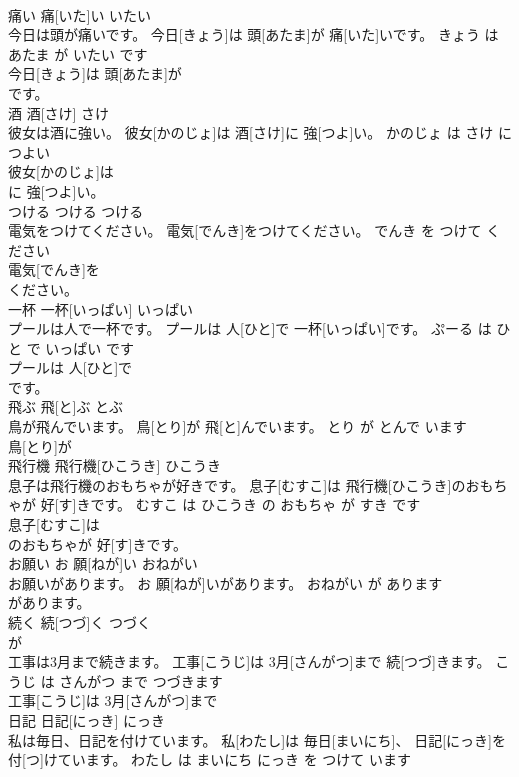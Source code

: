 \documentclass[8pt]{extreport}
\begin{document}
\begin{CJK}{UTF8}{min}
\\	痛い	痛[いた]い	いたい	
\\	今日は頭が痛いです。	今日[きょう]は 頭[あたま]が 痛[いた]いです。	きょう は あたま が いたい です	
\\	今日[きょう]は 頭[あたま]が
\\	です。		
\\	酒	酒[さけ]	さけ	
\\	彼女は酒に強い。	彼女[かのじょ]は 酒[さけ]に 強[つよ]い。	かのじょ は さけ に つよい	
\\	彼女[かのじょ]は
\\	に 強[つよ]い。		
\\	つける	つける	つける	
\\	電気をつけてください。	電気[でんき]をつけてください。	でんき を つけて ください	
\\	電気[でんき]を
\\	ください。		
\\	一杯	一杯[いっぱい]	いっぱい	
\\	プールは人で一杯です。	プールは 人[ひと]で 一杯[いっぱい]です。	ぷーる は ひと で いっぱい です	
\\	プールは 人[ひと]で
\\	です。		
\\	飛ぶ	飛[と]ぶ	とぶ	
\\	鳥が飛んでいます。	鳥[とり]が 飛[と]んでいます。	とり が とんで います	
\\	鳥[とり]が
\\	飛行機	飛行機[ひこうき]	ひこうき	
\\	息子は飛行機のおもちゃが好きです。	息子[むすこ]は 飛行機[ひこうき]のおもちゃが 好[す]きです。	むすこ は ひこうき の おもちゃ が すき です	
\\	息子[むすこ]は
\\	のおもちゃが 好[す]きです。		
\\	お願い	お 願[ねが]い	おねがい	
\\	お願いがあります。	お 願[ねが]いがあります。	おねがい が あります	
\\	があります。		
\\	続く	続[つづ]く	つづく	
\\	が		
\\	工事は3月まで続きます。	工事[こうじ]は 3月[さんがつ]まで 続[つづ]きます。	こうじ は さんがつ まで つづきます	
\\	工事[こうじ]は 3月[さんがつ]まで
\\	日記	日記[にっき]	にっき	
\\	私は毎日、日記を付けています。	私[わたし]は 毎日[まいにち]、 日記[にっき]を 付[つ]けています。	わたし は まいにち にっき を つけて います	

\end{CJK}
\end{document}

